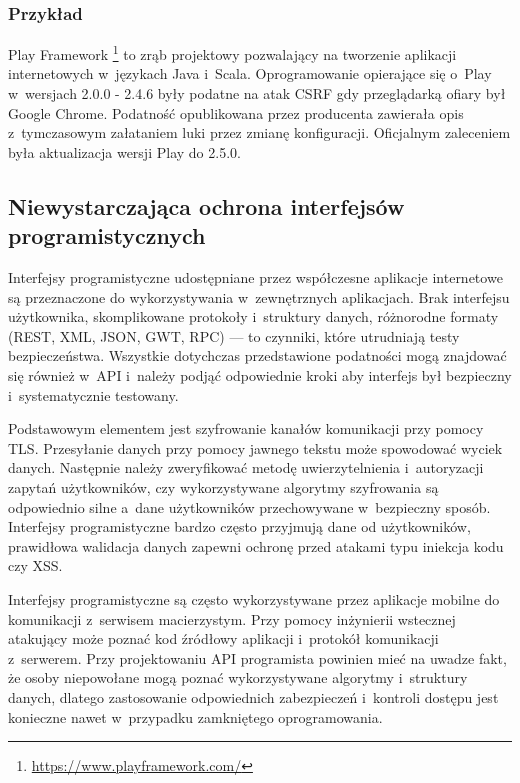 \documentclass[12pt,a4paper,polish,thesis]{dcsbook}
\begin{document}
\subsubsection*{Przykład}
Play Framework \footnote{\url{https://www.playframework.com/}} to zrąb projektowy pozwalający na tworzenie aplikacji internetowych w~językach Java i~Scala. Oprogramowanie opierające się o~Play w~wersjach 2.0.0 - 2.4.6 były podatne na atak CSRF gdy przeglądarką ofiary był Google Chrome. Podatność opublikowana przez producenta \cite{playv1} zawierała opis z~tymczasowym załataniem luki przez zmianę konfiguracji. Oficjalnym zaleceniem była aktualizacja wersji Play do 2.5.0.

\subsection{Niewystarczająca ochrona interfejsów programistycznych}
Interfejsy programistyczne udostępniane przez współczesne aplikacje internetowe są przeznaczone do wykorzystywania w~zewnętrznych aplikacjach. Brak interfejsu użytkownika, skomplikowane protokoły i~struktury danych, różnorodne formaty (REST, XML, JSON, GWT, RPC) --- to czynniki, które utrudniają testy bezpieczeństwa. Wszystkie dotychczas przedstawione podatności mogą znajdować się również w~API i~należy podjąć odpowiednie kroki aby interfejs był bezpieczny i~systematycznie testowany.

Podstawowym elementem jest szyfrowanie kanałów komunikacji przy pomocy TLS. Przesyłanie danych przy pomocy jawnego tekstu może spowodować wyciek danych. Następnie należy zweryfikować metodę uwierzytelnienia i~autoryzacji zapytań użytkowników, czy wykorzystywane algorytmy szyfrowania są odpowiednio silne a~dane użytkowników przechowywane w~bezpieczny sposób. Interfejsy programistyczne bardzo często przyjmują dane od użytkowników, prawidłowa walidacja danych zapewni ochronę przed atakami typu iniekcja kodu czy XSS.

Interfejsy programistyczne są często wykorzystywane przez aplikacje mobilne do komunikacji z~serwisem macierzystym. Przy pomocy inżynierii wstecznej atakujący może poznać kod źródłowy aplikacji i~protokół komunikacji z~serwerem. Przy projektowaniu API programista powinien mieć na uwadze fakt, że osoby niepowołane mogą poznać wykorzystywane algorytmy i~struktury danych, dlatego zastosowanie odpowiednich zabezpieczeń i~kontroli dostępu jest konieczne nawet w~przypadku zamkniętego oprogramowania.
\end{document}
